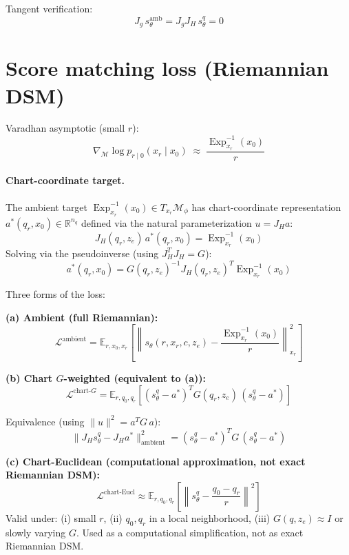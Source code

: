 \documentclass[11pt,a4paper]{article}
\DeclareMathOperator{\Exp}{Exp}
\newcommand{\R}{\mathbb{R}}
\newcommand{\E}{\mathbb{E}}
\newcommand{\Loss}{\mathcal{L}}
\newcommand{\Mphi}{\mathcal{M}_{\phi}}
\newcommand{\Mset}{\mathcal{M}}
\begin{document}
Tangent verification:
\begin{equation}
J_g \, s_\theta^{\text{amb}} = J_g J_H \, s_\theta^q = 0
\end{equation}

\section{Score matching loss (Riemannian DSM)}

Varadhan asymptotic (small $r$):
\begin{equation}
\nabla_{\Mset} \log p_{r \mid 0}(x_r \mid x_0) \;\approx\; \frac{\Exp_{x_r}^{-1}(x_0)}{r}
\end{equation}

\paragraph{Chart-coordinate target.} The ambient target $\Exp_{x_r}^{-1}(x_0) \in T_{x_r} \Mphi$ has chart-coordinate representation $a^*(q_r, x_0) \in \R^{n_q}$ defined via the natural parameterization $u = J_H a$:
\begin{equation}
J_H(q_r, z_e) \, a^*(q_r, x_0) = \Exp_{x_r}^{-1}(x_0)
\end{equation}
Solving via the pseudoinverse (using $J_H^T J_H = G$):
\begin{equation}
\boxed{ a^*(q_r, x_0) = G(q_r, z_e)^{-1} J_H(q_r, z_e)^T \Exp_{x_r}^{-1}(x_0) }
\end{equation}

Three forms of the loss:

\textbf{(a) Ambient (full Riemannian):}
\begin{equation}
\Loss^{\text{ambient}} = \E_{r, x_0, x_r} \left[ \left\| s_\theta(r, x_r, c, z_e) - \frac{\Exp_{x_r}^{-1}(x_0)}{r} \right\|^2_{x_r} \right]
\end{equation}

\textbf{(b) Chart $G$-weighted (equivalent to (a)):}
\begin{equation}
\Loss^{\text{chart-}G} = \E_{r, q_0, q_r} \left[ (s_\theta^q - a^*)^T G(q_r, z_e) \, (s_\theta^q - a^*) \right]
\end{equation}

Equivalence (using $\| u \|^2 = a^T G \, a$):
\begin{equation}
\| J_H s_\theta^q - J_H a^* \|^2_{\text{ambient}} = (s_\theta^q - a^*)^T G \, (s_\theta^q - a^*)
\end{equation}

\textbf{(c) Chart-Euclidean (computational approximation, not exact Riemannian DSM):}
\begin{equation}
\Loss^{\text{chart-Eucl}} \approx \E_{r, q_0, q_r} \left[ \left\| s_\theta^q - \frac{q_0 - q_r}{r} \right\|^2 \right]
\end{equation}
Valid under: (i) small $r$, (ii) $q_0, q_r$ in a local neighborhood, (iii) $G(q, z_e) \approx I$ or slowly varying $G$. Used as a computational simplification, not as exact Riemannian DSM.
\end{document}

